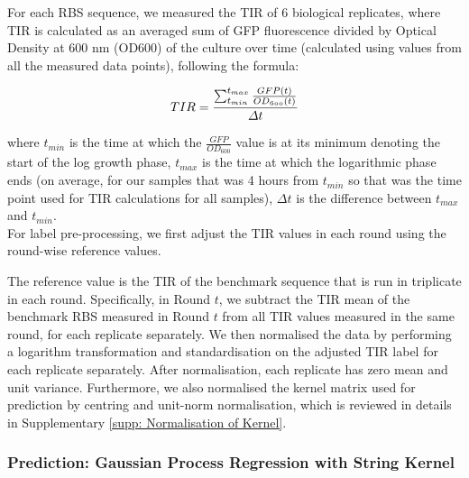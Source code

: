 \documentclass{scrartcl}[2013/05/29]%
\newcommand{\mengyan}[1]{\textcolor{magenta}{#1}}
\begin{document}
For each RBS sequence, we measured the TIR of 6 biological replicates, where TIR is calculated as an averaged sum of GFP fluorescence divided by Optical Density at 600 nm (OD600) of the culture over time (calculated using values from all the measured data points), following the formula:

$$\mathnormal{TIR=\frac{\sum_{t_{min}}^{t_{max}}\frac{GFP(t)}{OD_{600}(t)}}{\Delta t}}$$

where ${t_{min}}$ is the time at which the $\frac{GFP}{OD_{600}}$ value is at its minimum denoting the start of the log growth phase, ${t_{max}}$ is the time at which the logarithmic phase ends (on average, for our samples that was 4 hours from ${t_{min}}$ so that was the time point used for TIR calculations for all samples), ${\Delta t}$ is the difference between ${t_{max}}$ and ${t_{min}}$.\\

For label pre-processing, we first adjust the TIR values in each round using the round-wise reference values.

The reference value is the TIR of the benchmark sequence that is run in triplicate in each round.
Specifically, in Round $t$, we subtract the TIR mean of the benchmark RBS measured in Round $t$ from all TIR values measured in the same round, for each replicate separately. 
We then normalised the data by performing a logarithm transformation and standardisation on the adjusted TIR label for each replicate separately.
After normalisation, each replicate has zero mean and unit variance.
Furthermore, we also normalised the kernel matrix used for prediction by centring and unit-norm normalisation, which is reviewed in details in Supplementary \ref{supp: Normalisation of Kernel}.


\subsubsection{Prediction: Gaussian Process Regression with String Kernel}
\label{sec: method prediction with kernel}
\end{document}
